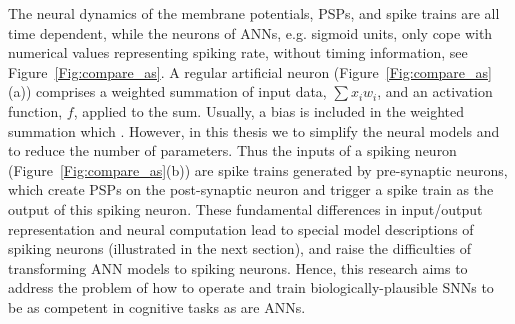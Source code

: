 The neural dynamics of the membrane potentials, PSPs, and spike trains are all time dependent, while the neurons of ANNs, e.g. sigmoid units, only cope with numerical values representing spiking rate, without timing information, see Figure~\ref{Fig:compare_as}.
A regular artificial neuron (Figure~\ref{Fig:compare_as}(a)) comprises a weighted summation of input data, $\sum x_i w_i$, and an activation function, $f$, applied to the sum.
Usually, a bias is included in the weighted summation which \DIFdelbegin {}\DIFdelend \DIFaddbegin {}\DIFaddend .
However, in this thesis we \DIFdelbegin {}\DIFdelend \DIFaddbegin {}\DIFaddend to simplify the neural models and to reduce the number of parameters.
\DIFaddbegin {}\DIFaddend Thus the inputs of a spiking neuron (Figure~\ref{Fig:compare_as}(b)) are spike trains generated by pre-synaptic neurons, which create PSPs on the post-synaptic neuron and trigger a spike train as the output of this spiking neuron.
These fundamental differences in input/output representation and neural computation lead to special model descriptions of spiking neurons (illustrated in the next section), and raise the difficulties of transforming ANN models to spiking neurons.
Hence, this research aims to address the problem of how to operate and train biologically-plausible SNNs to be as competent in cognitive tasks as are ANNs.


